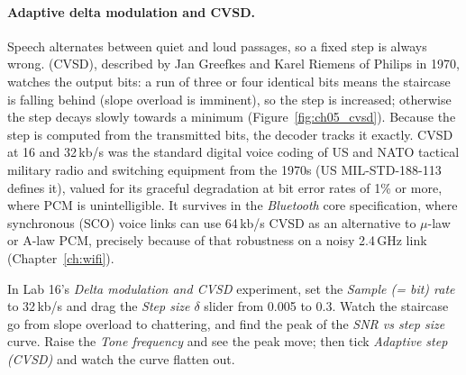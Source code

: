 \paragraph{Adaptive delta modulation and CVSD.} Speech alternates between quiet and loud
passages, so a fixed step is always wrong.  (CVSD), described by Jan Greefkes and Karel Riemens of Philips in 1970, watches the
output bits: a run of three or four identical bits means the staircase is falling behind
(slope overload is imminent), so the step is increased; otherwise the step decays slowly
towards a minimum (Figure~\ref{fig:ch05_cvsd}). Because the step is computed from the transmitted
bits, the decoder tracks it exactly. CVSD at 16 and 32\,kb/s was the standard digital voice coding
of US and NATO tactical military radio and switching equipment from the 1970s (US MIL-STD-188-113
defines it), valued for its graceful degradation at bit error rates of 1\% or more, where PCM is
unintelligible. It survives in the \emph{Bluetooth} core specification, where synchronous (SCO)
voice links can use 64\,kb/s CVSD as an alternative to $\mu$-law or A-law PCM, precisely because
of that robustness on a noisy 2.4\,GHz link (Chapter~\ref{ch:wifi}).


\begin{tryit}
In Lab 16's \emph{Delta modulation and CVSD} experiment, set the \emph{Sample (= bit) rate} to
32\,kb/s and drag the \emph{Step size $\delta$} slider from 0.005 to 0.3. Watch the staircase go
from slope overload to chattering, and find the peak of the \emph{SNR vs step size} curve. Raise
the \emph{Tone frequency} and see the peak move; then tick \emph{Adaptive step (CVSD)} and watch
the curve flatten out.
\end{tryit}

